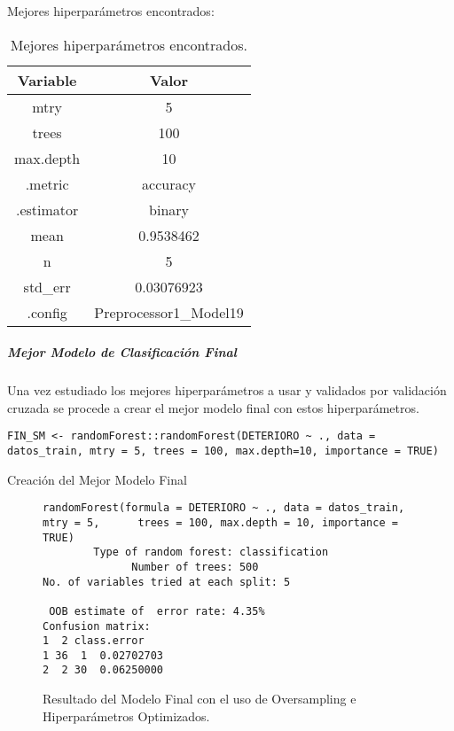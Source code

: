 Mejores hiperparámetros encontrados:

\begin{table}[H]
    \centering
    \begin{tabular}{|c|c|}
        \hline
        \textbf{Variable} & \textbf{Valor} \\
        \hline
        mtry & 5 \\
        trees & 100 \\
        max.depth & 10 \\
        .metric & accuracy \\
        .estimator & binary \\
        mean & 0.9538462 \\
        n & 5 \\
        std\_err & 0.03076923 \\
        .config & Preprocessor1\_Model19 \\
        \hline
    \end{tabular}
    \caption{Mejores hiperparámetros encontrados.}
    \label{tabla:mejores_hiperparametros}
\end{table}

\newpage
\subparagraph{Mejor Modelo de Clasificación Final}

Una vez estudiado los mejores hiperparámetros a usar y validados por validación cruzada se procede a crear el mejor modelo final con estos hiperparámetros.
\begin{code}[H]
\begin{lstlisting}[style=mystyle]
    FIN_SM <- randomForest::randomForest(DETERIORO ~ ., data = datos_train, mtry = 5, trees = 100, max.depth=10, importance = TRUE)
\end{lstlisting}
\caption{Creación del Mejor Modelo Final}
\label{code:Creación del Mejor Modelo Final}
\end{code}

\begin{figure}[H]
    \centering
    \begin{lstlisting}[frame=single, basicstyle=\small\ttfamily]
randomForest(formula = DETERIORO ~ ., data = datos_train, mtry = 5,      trees = 100, max.depth = 10, importance = TRUE) 
        Type of random forest: classification
              Number of trees: 500
No. of variables tried at each split: 5

 OOB estimate of  error rate: 4.35%
Confusion matrix:
1  2 class.error
1 36  1  0.02702703
2  2 30  0.06250000
    \end{lstlisting}
    \caption{Resultado del Modelo Final con el uso de Oversampling e Hiperparámetros Optimizados.}
    \label{fig:random_forest_FINAL_SMOTE_HIPER}
\end{figure}

